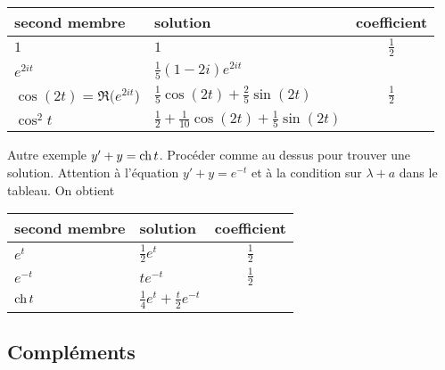 \begin{center}
\renewcommand{\arraystretch}{1.4}
\begin{tabular}{|l|l|c|} \hline
second membre             & solution                                               & coefficient \\ \hline
$1$                       &  $1$                                                   & $\frac{1}{2}$ \\ \hline
$e^{2it}$                 & $\frac{1}{5}(1-2i)e^{2it}$                             &  \\ \hline
$\cos(2t) = \Re(e^{2it}$) & $\frac{1}{5}\cos(2t)+\frac{2}{5}\sin(2t)$              & $\frac{1}{2}$ \\ \hline
$\cos^2 t$                & $\frac{1}{2}+\frac{1}{10}\cos(2t)+\frac{1}{5}\sin(2t)$ &  \\ \hline
\end{tabular}
\end{center}

Autre exemple $y' + y = \mathop{\mathrm{ch}} t$.\newline
Procéder comme au dessus pour trouver une solution. Attention à l'équation $y' + y = e^{-t}$ et à la condition sur $\lambda + a$ dans le tableau. On obtient
\begin{center}
\renewcommand{\arraystretch}{1.4}
\begin{tabular}{|l|l||c|} \hline
second membre    & solution                                   & coefficient \\ \hline
$e^t$            &  $\frac{1}{2}e^t$                          & $\frac{1}{2}$ \\ \hline
$e^{-t}$         & $te^{-t}$                                  & $\frac{1}{2}$  \\ \hline
$\mathop{\mathrm{ch}} t$          & $\frac{1}{4}e^{t} + \frac{t}{2}e^{-t}$ &  \\ \hline
\end{tabular}
\end{center}

\subsection{Compléments}
